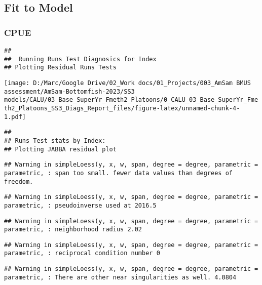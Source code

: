 \documentclass[
]{article}
\begin{document}
\hypertarget{fit-to-model}{%
\subsection{Fit to Model}\label{fit-to-model}}

\hypertarget{cpue}{%
\subsubsection{CPUE}\label{cpue}}

\begin{verbatim}
## 
##  Running Runs Test Diagnosics for Index 
## Plotting Residual Runs Tests
\end{verbatim}

\texttt{[image: D:/Marc/Google Drive/02\_Work docs/01\_Projects/003\_AmSam BMUS assessment/AmSam-Bottomfish-2023/SS3 models/CALU/03\_Base\_SuperYr\_Fmeth2\_Platoons/0\_CALU\_03\_Base\_SuperYr\_Fmeth2\_Platoons\_SS3\_Diags\_Report\_files/figure-latex/unnamed-chunk-4-1.pdf]}

\begin{verbatim}
## 
## Runs Test stats by Index:
## Plotting JABBA residual plot
\end{verbatim}

\begin{verbatim}
## Warning in simpleLoess(y, x, w, span, degree = degree, parametric = parametric, : span too small. fewer data values than degrees of freedom.
\end{verbatim}

\begin{verbatim}
## Warning in simpleLoess(y, x, w, span, degree = degree, parametric = parametric, : pseudoinverse used at 2016.5
\end{verbatim}

\begin{verbatim}
## Warning in simpleLoess(y, x, w, span, degree = degree, parametric = parametric, : neighborhood radius 2.02
\end{verbatim}

\begin{verbatim}
## Warning in simpleLoess(y, x, w, span, degree = degree, parametric = parametric, : reciprocal condition number 0
\end{verbatim}

\begin{verbatim}
## Warning in simpleLoess(y, x, w, span, degree = degree, parametric = parametric, : There are other near singularities as well. 4.0804
\end{verbatim}
\end{document}
